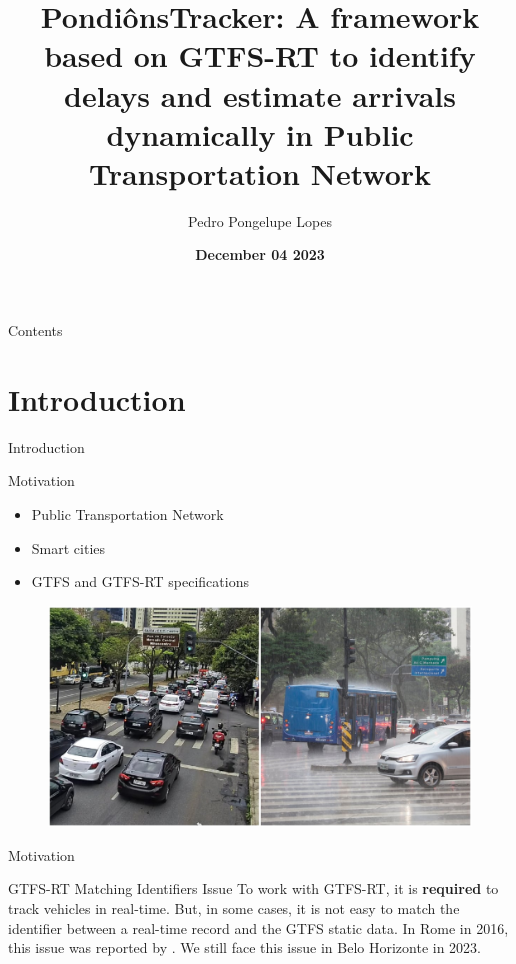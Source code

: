\documentclass[xcolor=dvipsnames,table]{beamer}
\title{PondiônsTracker: A framework based on GTFS-RT to identify delays and estimate arrivals dynamically in Public Transportation Network}
\author{
        Pedro Pongelupe Lopes
}
\institute{Programa de Pós-Graduação em Informática}
\date{\textbf{December 04 2023} }
\begin{document}
\begin{frame}
        \titlepage
\end{frame}

\begin{frame}{Contents}%
\end{frame}


\section{Introduction}
\begin{frame}{Introduction}
        \begin{block}{Motivation}
                \begin{itemize}
                        \item Public Transportation Network
                        \item Smart cities 
                        \item GTFS and GTFS-RT specifications
                \end{itemize}
        \end{block}
                \begin{figure}[H]
                        \centering
                        \includegraphics[scale=0.15]{images/chuva-engarrafamento.jpg}
                \end{figure}
\end{frame}

\begin{frame}{Motivation}
        \begin{block}{GTFS-RT Matching Identifiers Issue}
                To work with GTFS-RT, it is \textbf{required} to track vehicles in real-time. But, in some cases, it is not easy to match the identifier between a real-time record and the GTFS static data. In Rome in 2016, this issue was reported by \cite{bigdata}. We still face this issue in Belo Horizonte in 2023.
        \end{block}
\end{frame}
\end{document}
